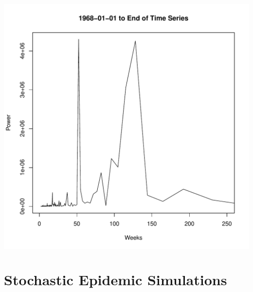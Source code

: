 \documentclass[12pt]{article}\usepackage[]{graphicx}\usepackage[]{color}
\makeatletter
\def\maxwidth{ %
  \ifdim\Gin@nat@width>\linewidth
    \linewidth
  \else
    \Gin@nat@width
  \fi
}
\newenvironment{knitrout}{}{} %
\makeatother
\begin{document}
\begin{enumerate}[(a)]
\begin{knitrout}
\includegraphics[width=\maxwidth]{figure/unnamed-chunk-5-6} 

\end{knitrout}

\end{enumerate}

\section{Stochastic Epidemic Simulations}

\SEintro
\end{document}
